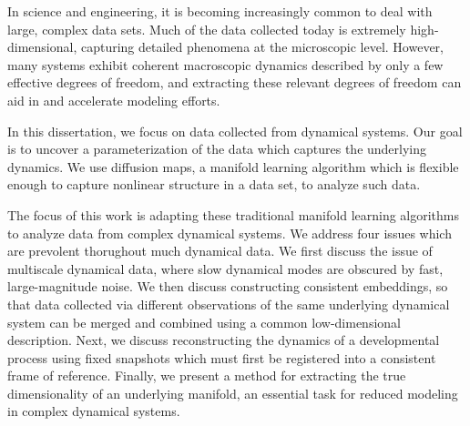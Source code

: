 In science and engineering, it is becoming increasingly common to deal with large, complex data sets. 
%
Much of the data collected today is extremely high-dimensional, capturing detailed phenomena at the microscopic level. 
%
However, many systems exhibit coherent macroscopic dynamics described by only a few effective degrees of freedom, and extracting these relevant degrees of freedom can aid in and accelerate modeling efforts. 

In this dissertation, we focus on data collected from dynamical systems.
%
Our goal is to uncover a parameterization of the data which captures the underlying dynamics.
%
We use diffusion maps, a manifold learning algorithm which is flexible enough to capture nonlinear structure in a data set, to analyze such data. 

The focus of this work is adapting these traditional manifold learning algorithms to analyze data from complex dynamical systems. 
%
We address four issues which are prevolent thorughout much dynamical data. 
%
We first discuss the issue of multiscale dynamical data, where slow dynamical modes are obscured by fast, large-magnitude noise. 
%
We then discuss constructing consistent embeddings, so that data collected via different observations of the same underlying dynamical system can be merged and combined using a common low-dimensional description. 
%
Next, we discuss reconstructing the dynamics of a developmental process using fixed snapshots which must first be registered into a consistent frame of reference. 
%
Finally, we present a method for extracting the true dimensionality of an underlying manifold, an essential task for reduced modeling in complex dynamical systems. 